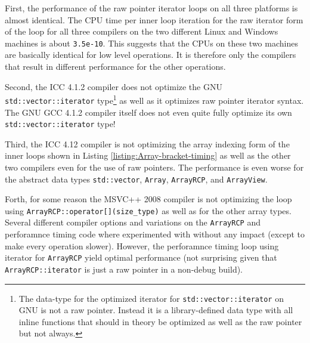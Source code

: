 \documentclass[pdf,ps2pdf,11pt]{SANDreport}
\begin{document}
First, the performance of the raw pointer iterator loops on all three
platforms is almost identical.  The CPU time per inner loop iteration
for the raw iterator form of the loop for all three compilers on the
two different Linux and Windows machines is about {}\texttt{3.5e-10}.
This suggests that the CPUs on these two machines are basically
identical for low level operations.  It is therefore only the
compilers that result in different performance for the other
operations.

Second, the ICC 4.1.2 compiler does not optimize the GNU
{}\texttt{std::vector::iterator} type\footnote{The data-type for the
optimized iterator for {}\texttt{std::vector::iterator} on GNU is not
a raw pointer.  Instead it is a library-defined data type with all
inline functions that should in theory be optimized as well as the raw
pointer but not always.} as well as it optimizes raw pointer iterator
syntax.  The GNU GCC 4.1.2 compiler itself does not even quite fully
optimize its own {}\texttt{std::vector::iterator} type!

Third, the ICC 4.12 compiler is not optimizing the array indexing form
of the inner loops shown in Listing
{}\ref{listing:Array-bracket-timing} as well as the other two
compilers even for the use of raw pointers.  The performance is even
worse for the abstract data types {}\texttt{std::vector},
{}\texttt{Array}, {}\texttt{ArrayRCP}, and {}\texttt{ArrayView}.

Forth, for some reason the MSVC++ 2008 compiler is not optimizing the
loop using {}\texttt{ArrayRCP::operator[](size\_type)} as well as for
the other array types.  Several different compiler options and
variations on the {}\texttt{ArrayRCP} and perforamnce timing code
where experimented with without any impact (except to make every
operation slower).  However, the perforamnce timing loop using
iterator for {}\texttt{ArrayRCP} yield optimal performance (not
surprising given that {}\texttt{ArrayRCP::iterator} is just a raw
pointer in a non-debug build).
\end{document}
